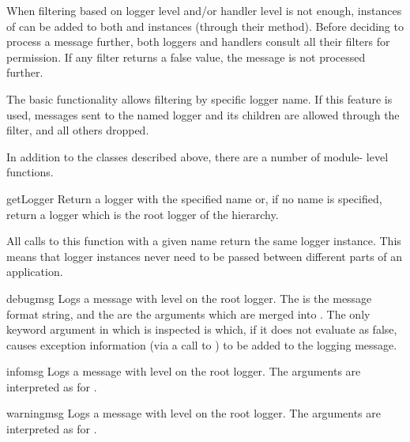 When filtering based on logger level and/or handler level is not enough,
instances of  can be added to both  and
 instances (through their  method).
Before deciding to process a message further, both loggers and handlers
consult all their filters for permission. If any filter returns a false
value, the message is not processed further.

The basic  functionality allows filtering by specific logger
name. If this feature is used, messages sent to the named logger and its
children are allowed through the filter, and all others dropped.

In addition to the classes described above, there are a number of module-
level functions.

\begin{funcdesc}{getLogger}{}
Return a logger with the specified name or, if no name is specified, return
a logger which is the root logger of the hierarchy.

All calls to this function with a given name return the same logger instance.
This means that logger instances never need to be passed between different
parts of an application.
\end{funcdesc}

\begin{funcdesc}{debug}{msg}
Logs a message with level  on the root logger.
The  is the message format string, and the  are the
arguments which are merged into . The only keyword argument in
 which is inspected is  which, if it does not
evaluate as false, causes exception information (via a call to
) to be added to the logging message.
\end{funcdesc}

\begin{funcdesc}{info}{msg}
Logs a message with level  on the root logger.
The arguments are interpreted as for .
\end{funcdesc}

\begin{funcdesc}{warning}{msg}
Logs a message with level  on the root logger.
The arguments are interpreted as for .
\end{funcdesc}

